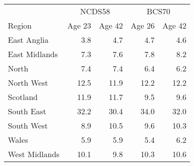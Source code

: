 
\begin{tabular}{lrrrr}
\toprule
\multicolumn{1}{c}{} & \multicolumn{2}{c}{NCDS58} & \multicolumn{2}{c}{BCS70} \\
\cmidrule(l{3pt}r{3pt}){2-3} \cmidrule(l{3pt}r{3pt}){4-5}
Region & Age 23 & Age 42 & Age 26 & Age 42\\
\midrule
East Anglia & 3.8 & 4.7 & 4.7 & 4.6\\
East Midlands & 7.3 & 7.6 & 7.8 & 8.2\\
North & 7.4 & 7.4 & 6.4 & 6.2\\
North West & 12.5 & 11.9 & 12.2 & 12.2\\
Scotland & 11.9 & 11.7 & 9.5 & 9.6\\
South East & 32.2 & 30.4 & 34.0 & 32.0\\
South West & 8.9 & 10.5 & 9.6 & 10.3\\
Wales & 5.9 & 5.9 & 5.4 & 6.2\\
West Midlands & 10.1 & 9.8 & 10.3 & 10.6\\
\bottomrule
\end{tabular}
